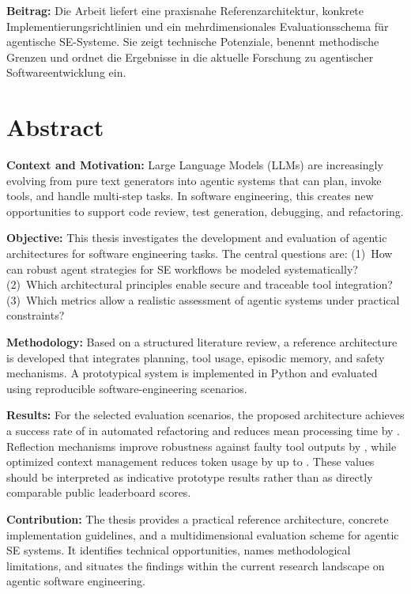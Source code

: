 \textbf{Beitrag:} Die Arbeit liefert eine praxisnahe Referenzarchitektur, konkrete Implementierungsrichtlinien und ein mehrdimensionales Evaluationsschema für agentische SE-Systeme. Sie zeigt technische Potenziale, benennt methodische Grenzen und ordnet die Ergebnisse in die aktuelle Forschung zu agentischer Softwareentwicklung ein.%
\par
\endgroup

\chapter*{Abstract}

\begingroup
\setlength{\parskip}{0.5em}
\textbf{Context and Motivation:} Large Language Models (LLMs) are increasingly evolving from pure text generators into agentic systems that can plan, invoke tools, and handle multi-step tasks. In software engineering, this creates new opportunities to support code review, test generation, debugging, and refactoring.

\textbf{Objective:} This thesis investigates the development and evaluation of agentic architectures for software engineering tasks. The central questions are: (1)~How can robust agent strategies for SE workflows be modeled systematically? (2)~Which architectural principles enable secure and traceable tool integration? (3)~Which metrics allow a realistic assessment of agentic systems under practical constraints?

\textbf{Methodology:} Based on a structured literature review, a reference architecture is developed that integrates planning, tool usage, episodic memory, and safety mechanisms. A prototypical system is implemented in Python and evaluated using reproducible software-engineering scenarios.

\textbf{Results:} For the selected evaluation scenarios, the proposed architecture achieves a success rate of  in automated refactoring and reduces mean processing time by . Reflection mechanisms improve robustness against faulty tool outputs by , while optimized context management reduces token usage by up to . These values should be interpreted as indicative prototype results rather than as directly comparable public leaderboard scores.

\textbf{Contribution:} The thesis provides a practical reference architecture, concrete implementation guidelines, and a multidimensional evaluation scheme for agentic SE systems. It identifies technical opportunities, names methodological limitations, and situates the findings within the current research landscape on agentic software engineering.%
\par
\endgroup

\cleardoublepage
